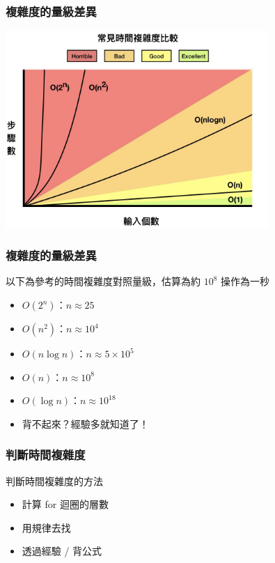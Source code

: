 \documentclass[mathserif]{beamer}
\begin{document}
\begin{frame}
    \frametitle{複雜度的量級差異}
    \includegraphics[width=10.0cm]{img/time.png}
\end{frame}

\begin{frame}
    \frametitle{複雜度的量級差異}
    以下為參考的時間複雜度對照量級，估算為約 $10^8$ 操作為一秒
    \begin{itemize}
        \item $O(2^n)$：$n \approx 25$
        \item $O(n^2)$：$n \approx 10^4$
        \item $O(n \log{n})$：$n \approx 5 \times 10^5$
        \item $O(n)$：$n \approx 10^8$
        \item $O(\log{n})$：$n \approx 10^{18}$
        \vspace{0.5cm}
        \item<2-> 背不起來？經驗多就知道了！
    \end{itemize}
\end{frame}

\begin{frame}
    \frametitle{判斷時間複雜度}
    判斷時間複雜度的方法
    \vspace{0.5cm}
    \begin{itemize}
        \item 計算 for 迴圈的層數
        \item 用規律去找
        \item 透過經驗 / 背公式
    \end{itemize}
\end{frame}
\end{document}
